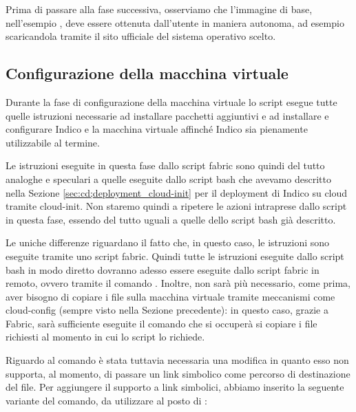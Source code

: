            Prima di passare alla fase successiva, osserviamo che l'immagine di base, nell'esempio , deve essere ottenuta dall'utente in maniera autonoma, ad esempio scaricandola tramite il sito ufficiale del sistema operativo scelto.
            
        \subsection{Configurazione della macchina virtuale} \label{subsec:cd;civ;configurazione_macchina_virtuale}
        
            Durante la fase di configurazione della macchina virtuale lo script esegue tutte quelle istruzioni necessarie ad installare pacchetti aggiuntivi e ad installare e configurare Indico e la macchina virtuale affinché Indico sia pienamente utilizzabile al termine.
            
            Le istruzioni eseguite in questa fase dallo script fabric sono quindi del tutto analoghe e speculari a quelle eseguite dallo script bash che avevamo descritto nella Sezione \ref{sec:cd;deployment_cloud-init} per il deployment di Indico su cloud tramite cloud-init. Non staremo quindi a ripetere le azioni intraprese dallo script in questa fase, essendo del tutto uguali a quelle dello script bash già descritto.
            
            Le uniche differenze riguardano il fatto che, in questo caso, le istruzioni sono eseguite tramite uno script fabric. Quindi tutte le istruzioni eseguite dallo script bash in modo diretto dovranno adesso essere eseguite dallo script fabric in remoto, ovvero tramite il comando . Inoltre, non sarà più necessario, come prima, aver bisogno di copiare i file sulla macchina virtuale tramite meccanismi come cloud-config (sempre visto nella Sezione precedente): in questo caso, grazie a Fabric, sarà sufficiente eseguite il comando  che si occuperà si copiare i file richiesti al momento in cui lo script lo richiede.
            
            Riguardo al comando  è stata tuttavia necessaria una modifica in quanto esso non supporta, al momento, di passare un link simbolico come percorso di destinazione del file. Per aggiungere il supporto a link simbolici, abbiamo inserito la seguente variante del comando, da utilizzare al posto di :
            
